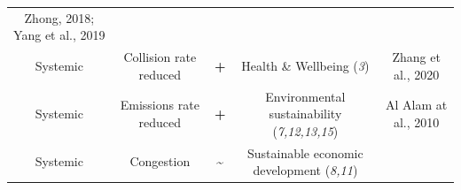 \documentclass[
]{book}
\begin{document}
\begin{longtable}[]{@{}ccccc@{}}
\begin{minipage}[t]{0.17\columnwidth}
Zhong, 2018; Yang et al., 2019\strut
\end{minipage}\tabularnewline
\begin{minipage}[t]{0.17\columnwidth}\centering
Systemic\strut
\end{minipage} & \begin{minipage}[t]{0.16\columnwidth}\centering
Collision rate reduced\strut
\end{minipage} & \begin{minipage}[t]{0.17\columnwidth}\centering
\textbf{+}\strut
\end{minipage} & \begin{minipage}[t]{0.17\columnwidth}\centering
Health \& Wellbeing (\emph{3})\strut
\end{minipage} & \begin{minipage}[t]{0.17\columnwidth}\centering
Zhang et al., 2020\strut
\end{minipage}\tabularnewline
\begin{minipage}[t]{0.17\columnwidth}\centering
Systemic\strut
\end{minipage} & \begin{minipage}[t]{0.16\columnwidth}\centering
Emissions rate reduced\strut
\end{minipage} & \begin{minipage}[t]{0.17\columnwidth}\centering
\textbf{+}\strut
\end{minipage} & \begin{minipage}[t]{0.17\columnwidth}\centering
Environmental sustainability (\emph{7,12,13,15})\strut
\end{minipage} & \begin{minipage}[t]{0.17\columnwidth}\centering
Al Alam at al., 2010\strut
\end{minipage}\tabularnewline
\begin{minipage}[t]{0.17\columnwidth}\centering
Systemic\strut
\end{minipage} & \begin{minipage}[t]{0.16\columnwidth}\centering
Congestion\strut
\end{minipage} & \begin{minipage}[t]{0.17\columnwidth}\centering
\textbf{\textasciitilde{}}\strut
\end{minipage} & \begin{minipage}[t]{0.17\columnwidth}\centering
Sustainable economic development (\emph{8,11})\strut
\end{minipage} & \begin{minipage}[t]{0.17\columnwidth}\centering

\end{minipage}
\end{longtable}
\end{document}

